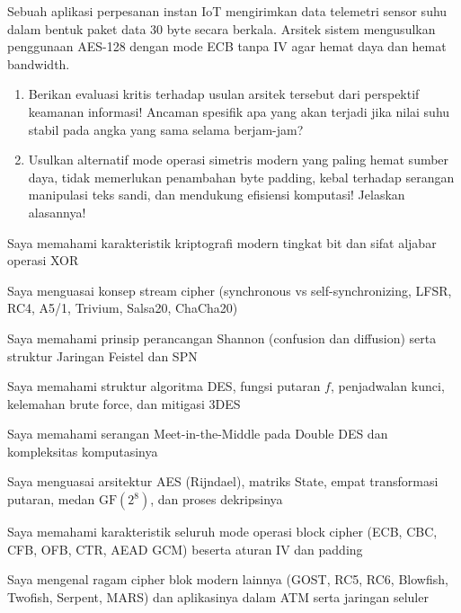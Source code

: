 \documentclass[main.tex]{subfiles}
\begin{document}
\begin{asesmen}
Sebuah aplikasi perpesanan instan IoT mengirimkan data telemetri sensor suhu dalam bentuk paket data 30 byte secara berkala. Arsitek sistem mengusulkan penggunaan AES-128 dengan mode ECB tanpa IV agar hemat daya dan hemat bandwidth.
\begin{enumerate}
  \item Berikan evaluasi kritis terhadap usulan arsitek tersebut dari perspektif keamanan informasi! Ancaman spesifik apa yang akan terjadi jika nilai suhu stabil pada angka yang sama selama berjam-jam?
  \item Usulkan alternatif mode operasi simetris modern yang paling hemat sumber daya, tidak memerlukan penambahan byte padding, kebal terhadap serangan manipulasi teks sandi, dan mendukung efisiensi komputasi! Jelaskan alasannya!
\end{enumerate}
\end{asesmen}


\begin{checklist}
  \item Saya memahami karakteristik kriptografi modern tingkat bit dan sifat aljabar operasi XOR
  \item Saya menguasai konsep stream cipher (synchronous vs self-synchronizing, LFSR, RC4, A5/1, Trivium, Salsa20, ChaCha20)
  \item Saya memahami prinsip perancangan Shannon (confusion dan diffusion) serta struktur Jaringan Feistel dan SPN
  \item Saya memahami struktur algoritma DES, fungsi putaran $f$, penjadwalan kunci, kelemahan brute force, dan mitigasi 3DES
  \item Saya memahami serangan Meet-in-the-Middle pada Double DES dan kompleksitas komputasinya
  \item Saya menguasai arsitektur AES (Rijndael), matriks State, empat transformasi putaran, medan $\mathrm{GF}(2^8)$, dan proses dekripsinya
  \item Saya memahami karakteristik seluruh mode operasi block cipher (ECB, CBC, CFB, OFB, CTR, AEAD GCM) beserta aturan IV dan padding
  \item Saya mengenal ragam cipher blok modern lainnya (GOST, RC5, RC6, Blowfish, Twofish, Serpent, MARS) dan aplikasinya dalam ATM serta jaringan seluler
\end{checklist}
\end{document}
